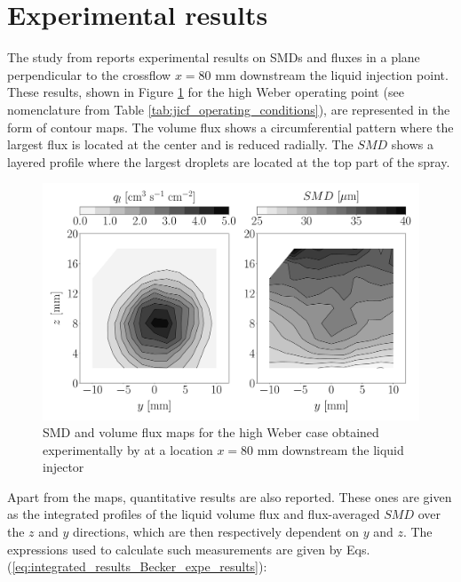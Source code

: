 \section{Experimental results}
\label{sec:ch6_experimental_results}

The study from  reports experimental results on SMDs and fluxes in a plane perpendicular to the crossflow $x = 80$ mm downstream the liquid injection point. These results, shown in Figure \ref{fig:maps_Becker_expe_results} for the high Weber operating point (see nomenclature from Table \ref{tab:jicf_operating_conditions}), are represented in the form of contour maps.  The volume flux shows a circumferential pattern where the largest flux is located at the center and is reduced radially. The $SMD$ shows a layered profile where the largest droplets are located at the top part of the spray.

\begin{figure}[h!]
\centering
   \includegraphics[scale=0.19]{./part2_developments/figures_ch6_lagrangian_JICF/expe_results/maps_UG100}
\caption{SMD and volume flux maps for the high Weber case obtained experimentally by  at a location $x = 80$ mm downstream the liquid injector}
\label{fig:maps_Becker_expe_results}
\end{figure}

Apart from the maps, quantitative results are also reported. These ones are given as the integrated profiles of the liquid volume flux and flux-averaged $SMD$ over the $z$ and $y$ directions, which are then respectively dependent on $y$ and $z$. The expressions used to calculate such measurements are given by Eqs. (\ref{eq:integrated_results_Becker_expe_results}):


